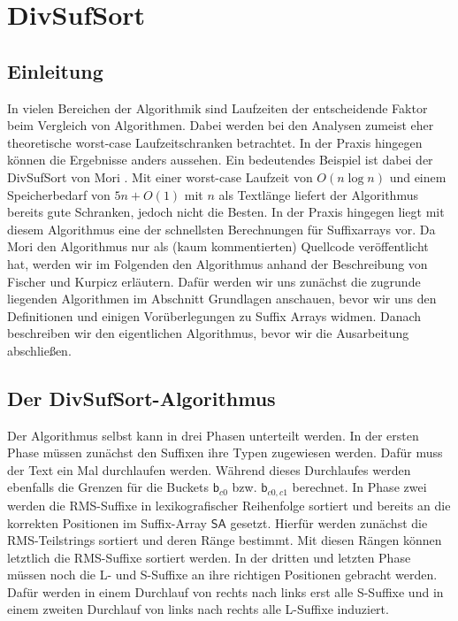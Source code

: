 \section{DivSufSort}
\label{algorithm:divsufsort}

\subsection{Einleitung}
In  vielen Bereichen der Algorithmik sind Laufzeiten der entscheidende Faktor beim Vergleich von Algorithmen. Dabei werden bei den Analysen zumeist eher theoretische worst-case Laufzeitschranken betrachtet.
In der Praxis hingegen können die Ergebnisse anders aussehen. Ein bedeutendes Beispiel ist dabei der DivSufSort von Mori \cite{saca:5:repo}. Mit einer worst-case Laufzeit von $O(n\log{n})$ und einem Speicherbedarf von $5n + O(1)$ mit $n$ als Textlänge liefert der Algorithmus bereits gute Schranken, jedoch nicht die Besten. In der Praxis hingegen liegt mit diesem Algorithmus eine der schnellsten Berechnungen für Suffixarrays vor. Da Mori den Algorithmus nur als (kaum kommentierten) Quellcode veröffentlicht hat, werden wir im Folgenden den Algorithmus anhand der Beschreibung von Fischer und Kurpicz \cite{saca:5} erläutern. Dafür werden wir uns zunächst die zugrunde liegenden Algorithmen im Abschnitt Grundlagen anschauen, bevor wir uns den Definitionen und einigen Vorüberlegungen zu Suffix Arrays widmen. Danach beschreiben wir den eigentlichen Algorithmus, bevor wir die Ausarbeitung abschließen.




\subsection{Der DivSufSort-Algorithmus}

Der Algorithmus selbst kann in drei Phasen unterteilt werden. In der ersten Phase müssen zunächst den Suffixen ihre Typen zugewiesen werden. Dafür muss der Text ein Mal durchlaufen werden. Während dieses Durchlaufes werden ebenfalls die Grenzen für die Buckets $\mathsf{b}_{c0}$ bzw. $\mathsf{b}_{c0,c1}$ berechnet. In Phase zwei werden die RMS-Suffixe in lexikografischer Reihenfolge sortiert und bereits an die korrekten Positionen im Suffix-Array $\mathsf{SA}$ gesetzt. Hierfür werden zunächst die RMS-Teilstrings sortiert und deren Ränge bestimmt. Mit diesen Rängen können letztlich die RMS-Suffixe sortiert werden. In der dritten und letzten Phase müssen noch die L- und S-Suffixe an ihre richtigen Positionen gebracht werden. Dafür werden in einem Durchlauf von rechts nach links erst alle S-Suffixe und in einem zweiten Durchlauf von links nach rechts alle L-Suffixe induziert.

